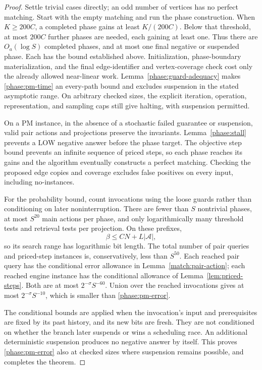 \begin{proof}
Settle trivial cases directly; an odd number of vertices
has no perfect matching.  Start with the empty matching
and run the phase construction.  When
\(K\ge200C\), a completed phase gains at least
\(K/(200C)\).  Below that threshold, at most \(200C\)
further phases are needed, each gaining at least one.
Thus there are \(O_a(\log S)\) completed phases, and
at most one final negative or suspended phase.
Each has the bound established above.
Initialization, phase-boundary materialization, and the
final edge-identifier and vertex-coverage check cost
only the already allowed near-linear work.
Lemma~\ref{phase:guard-adequacy} makes
\eqref{phase:pm-time} an every-path bound and excludes
suspension in the stated asymptotic range.
On arbitrary checked sizes, the explicit iteration,
operation, representation, and sampling caps still give
halting, with suspension permitted.

On a PM instance, in the absence of a stochastic failed
guarantee or suspension, valid pair actions and
projections preserve the invariants.
Lemma~\ref{phase:stall} prevents a \(\mathrm{LOW}\)
negative answer before the phase target.  The objective
step bound prevents an infinite sequence of priced
steps, so each phase reaches its gains and the algorithm
eventually constructs a perfect matching.
Checking the proposed edge copies and coverage excludes
false positives on every input, including no-instances.

For the probability bound, count invocations using the
loose guards rather than conditioning on later
noninterruption.  There are fewer than \(S\) nontrivial
phases, at most \(S^{20}\) main actions per phase, and
only logarithmically many threshold tests and retrieval
tests per projection.  On these prefixes,
\[
                      \beta\le CN+L|\mathcal A|,
\]
so its search range has logarithmic bit length.
The total number of pair queries and priced-step
instances is, conservatively, less than \(S^{50}\).
Each reached pair query has the conditional error
allowance in Lemma~\ref{match:pair-action}; each reached
engine instance has the conditional allowance of
Lemma~\ref{lem:priced-steps}.  Both are at most
\(2^{-\sigma}S^{-60}\).
Union over the reached invocations gives at most
\(2^{-\sigma}S^{-10}\), which is smaller than
\eqref{phase:pm-error}.

The conditional bounds are applied when the invocation's
input and prerequisites are fixed by its past history,
and its new bits are fresh.  They are not conditioned on
whether the branch later suspends or wins a scheduling
race.  An additional deterministic suspension produces
no negative answer by itself.  This proves
\eqref{phase:pm-error} also at checked sizes where
suspension remains possible, and completes the theorem.
\end{proof}
